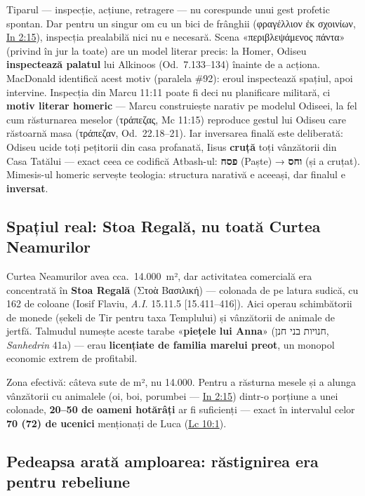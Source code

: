 \documentclass[12pt,a4paper,twoside,openany]{book}
\begin{document}
Tiparul — inspecție, acțiune, retragere — nu corespunde unui gest profetic spontan. Dar pentru un singur om cu un bici de frânghii (φραγέλλιον ἐκ σχοινίων, \href{https://bibliaortodoxa.ro/carte.php?id=35\&cap=2\#15}{In 2:15}), inspecția prealabilă nici nu e necesară. Scena «περιβλεψάμενος πάντα» (privind în jur la toate) are un model literar precis: la Homer, Odiseu \textbf{inspectează palatul} lui Alkinoos (Od.\ 7.133--134) înainte de a acționa. MacDonald identifică acest motiv (paralela \#92): eroul inspectează spațiul, apoi intervine. Inspecția din Marcu 11:11 poate fi deci nu planificare militară, ci \textbf{motiv literar homeric} — Marcu construiește narativ pe modelul Odiseei, la fel cum răsturnarea meselor (τράπεζας, Mc 11:15) reproduce gestul lui Odiseu care răstoarnă masa (τράπεζαν, Od.\ 22.18--21). Iar inversarea finală este deliberată: Odiseu ucide toți pețitorii din casa profanată, Iisus \textbf{cruță} toți vânzătorii din Casa Tatălui — exact ceea ce codifică Atbash-ul: \textbf{פסח} (Paște) → \textbf{וחס} (și a cruțat). Mimesis-ul homeric servește teologia: structura narativă e aceeași, dar finalul e \textbf{inversat}.

\subsection{Spațiul real: Stoa Regală, nu toată Curtea Neamurilor}

Curtea Neamurilor avea cca.\ 14.000~m², dar activitatea comercială era concentrată în \textbf{Stoa Regală} (Στοὰ Βασιλική) — colonada de pe latura sudică, cu 162 de coloane (Iosif Flaviu, \textit{A.I.} 15.11.5 [15.411--416]). Aici operau schimbătorii de monede (șekeli de Tir pentru taxa Templului) și vânzătorii de animale de jertfă. Talmudul numește aceste tarabe «\textbf{piețele lui Anna}» (חנויות בני חנן, \textit{Sanhedrin} 41a) — erau \textbf{licențiate de familia marelui preot}, un monopol economic extrem de profitabil.

Zona efectivă: câteva sute de m², nu 14.000. Pentru a răsturna mesele și a alunga vânzătorii cu animalele (oi, boi, porumbei — \href{https://bibliaortodoxa.ro/carte.php?id=35\&cap=2\#15}{In 2:15}) dintr-o porțiune a unei colonade, \textbf{20--50 de oameni hotărâți} ar fi suficienți — exact în intervalul celor \textbf{70 (72) de ucenici} menționați de Luca (\href{https://bibliaortodoxa.ro/carte.php?id=48\&cap=10\#1}{Lc 10:1}).

\subsection{Pedeapsa arată amploarea: răstignirea era pentru rebeliune}
\end{document}
